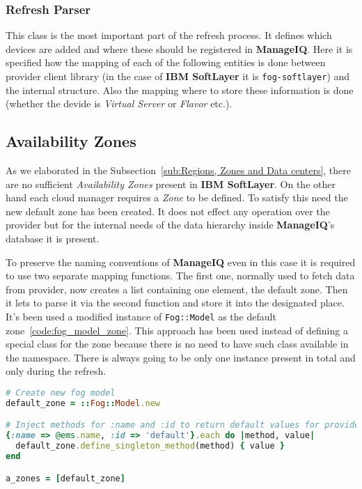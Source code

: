 \subsubsection{Refresh Parser}
\label{subs:Refresh Parser}

This class is the most important part of the refresh process. It defines which devices are added and where these should be registered in \textbf{ManageIQ}. Here it is specified how the mapping of each of the following entities is done between provider client library (in the case of \textbf{IBM SoftLayer} it is \texttt{fog-softlayer}) and the internal structure. Also the mapping where to store these information is done (whether the devide is \emph{Virtual Server} or \emph{Flavor} etc.).

\clearpage
\subsection{Availability Zones}
\label{sub:Availability Zones}

As we elaborated in the Subsection~\ref{sub:Regions, Zones and Data centers}, there are no sufficient \emph{Availability Zones} present in \textbf{IBM SoftLayer}. On the other hand each cloud manager requires a \emph{Zone} to be defined. To satisfy this need the new default zone has been created. It does not effect any operation over the provider but for the internal needs of the data hierarchy inside \textbf{ManageIQ}'s database it is present.

To preserve the naming conventions of \textbf{ManageIQ} even in this case it is required to use two separate mapping functions. The first one, normally used to fetch data from provider, now creates a list containing one element, the default zone. Then it lets to parse it via the second function and store it into the designated place. It's been used a modified instance of \verb|Fog::Model| as the default zone~\ref{code:fog_model_zone}. This approach has been used instead of defining a special class for the zone because there is no need to have such class available in the namespace. There is always going to be only one instance present in total and only during the refresh.

\begin{lstlisting}[language=Ruby,caption={Declaration of the default \emph{Availability Zone}},label=code:fog_model_zone,float=htpb]
# Create new fog model
default_zone = ::Fog::Model.new

# Inject methods for :name and :id to return default values for provider
{:name => @ems.name, :id => 'default'}.each do |method, value|
  default_zone.define_singleton_method(method) { value }
end

a_zones = [default_zone]
\end{lstlisting}

